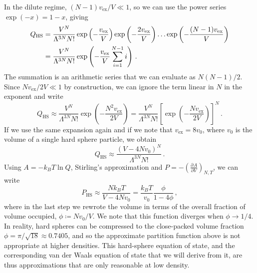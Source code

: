 \documentclass{article}
\theoremstyle{plain}\theoremheaderfont{\normalfont\bfseries}\theorembodyfont{\rmfamily}\theoremseparator{.}\newtheorem*{thm}{Theorem}\newtheorem*{law}{Law}\newtheorem*{pos}{Postulate}
\numberwithin{equation}{section}
\newcommand{\pdv}[3][]{\frac{\partial^{#1} #2}{{\partial #3}^{#1}}}
\begin{document}
    In the dilute regime, \((N-1)v_{\text{ex}}/V\ll 1\), so we can use the power series \(\exp(-x)=1-x\), giving
    \begin{align}
        Q_{\text{HS}}&=\frac{V^N}{\Lambda^{3N}N!}\exp\left(-\frac{v_{\text{ex}}}{V}\right)\exp\left(-\frac{2v_{\text{ex}}}{V}\right)\dots\exp\left(-\frac{(N-1)v_{\text{ex}}}{V}\right)\notag\\
        &=\frac{V^N}{\Lambda^{3N}N!}\exp\left(-\frac{v_{\text{ex}}}{V}\sum_{i=1}^{N-1}i\right)\,.
    \end{align}
    The summation is an arithmetic series that we can evaluate as \(N(N-1)/2\). Since \(Nv_{\text{ex}}/2V\ll 1\) by construction, we can ignore the term linear in \(N\) in the exponent and write
    \begin{equation}
        Q_{\text{HS}}\approx\frac{V^N}{\Lambda^{3N}N!}\exp\left(-\frac{N^2v_{\text{ex}}}{2V}\right)=\frac{V^N}{\Lambda^{3N}N!}\left[\exp\left(-\frac{Nv_{\text{ex}}}{2V}\right)\right]^N\,.
    \end{equation}
    If we use the same expansion again and if we note that \(v_{\text{ex}}=8v_0\), where \(v_0\) is the volume of a single hard sphere particle, we obtain
    \begin{equation}
        Q_{\text{HS}}\approx\frac{(V-4Nv_0)^N}{\Lambda^{3N}N!}\,.
    \end{equation}
    Using \(A=-k_B T\ln Q\), Stirling's approximation and \(P=-(\pdv{A}{V})_{N,T}\), we can write
    \begin{equation}
        P_{\text{HS}}\approx\frac{Nk_BT}{V-4Nv_0}=\frac{k_B T}{v_0}\frac{\phi}{1-4\phi}\,,
    \end{equation}
    where in the last step we rewrote the volume in terms of the overall fraction of volume occupied, \(\phi\coloneqq Nv_0/V\). We note that this function diverges when \(\phi\to 1/4\). In reality, hard spheres can be compressed to the close-packed volume fraction \(\phi=\pi/\sqrt{18}\approx 0.7405\), and so the approximate partition function above is not appropriate at higher densities. This hard-sphere equation of state, and the corresponding van der Waals equation of state that we will derive from it, are thus approximations that are only reasonable at low density.
\end{document}
